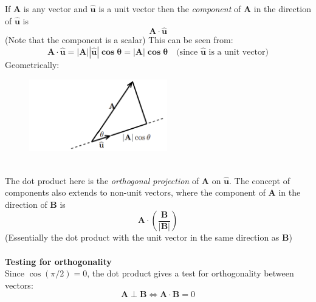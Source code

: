 \documentclass{report}
\begin{document}
If $\mathbf{A}$ is any vector and $\mathbf{\hat{u}}$ is a unit vector then the \textit{component}
of $\mathbf{A}$ in the direction of $\mathbf{\hat{u}}$ is 
\begin{equation*}
\mathbf{A\cdot\hat{u}}
\end{equation*}
(Note that the component is a scalar) This can be seen from:
\begin{equation*}
\mathbf{A\cdot\hat{u}=|A||\hat{u}|\cos\theta=|A|\cos\theta}\quad
\text{(since $\mathbf{\hat{u}}$ is a unit vector)}
\end{equation*}
Geometrically:
\begin{figure}[h]
\includegraphics[width=6cm]{Capture69}\\
\centering
\end{figure}\\
The dot product here is the \textit{orthogonal projection} of $\mathbf{A}$ on 
$\mathbf{\hat{u}}$. The concept of components also extends to non-unit vectors, where
the component of $\mathbf{A}$ in the direction of $\mathbf{B}$ is 
\begin{equation*}
\mathbf{A\cdot\left(\frac{B}{|B|}\right)}
\end{equation*}
(Essentially the dot product with the unit vector in the same direction as $\mathbf{B}$)\\
\vspace{1mm}\\
\textbf{Testing for orthogonality}\\
Since $\cos(\pi/2)=0$, the dot product gives a test for orthogonality between vectors:
\begin{equation*}
\mathbf{A\perp B}\iff\mathbf{A\cdot B}=0
\end{equation*}
\newpage
\end{document}
